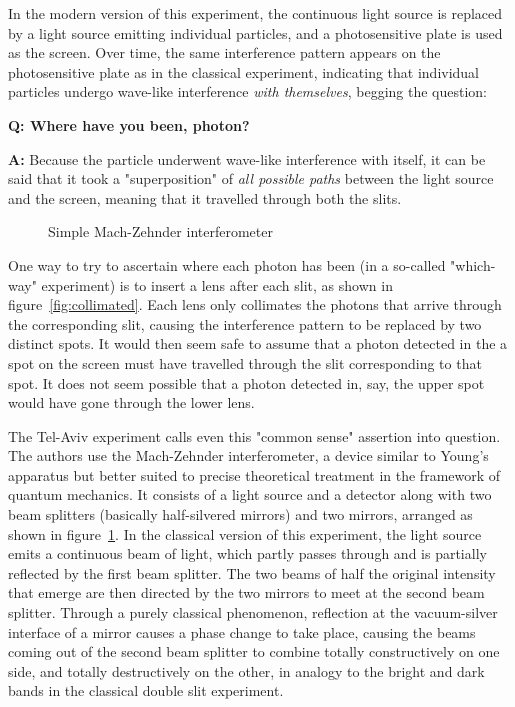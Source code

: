 \documentclass{article}
\newcommand{\Q}{\bfseries Q: }
\newcommand{\A}{\par\textbf{A:} \normalfont}
\begin{document}
In the modern version of this experiment, the continuous light source is 
replaced by a light source emitting individual particles, and a photosensitive 
plate is used as the screen. Over time, the same interference pattern appears 
on the photosensitive plate as in the classical experiment, indicating that 
individual particles undergo wave-like interference \textit{with themselves}, 
begging the question: 

\begin{framed}
\Q Where have you been, photon?  

\A Because the particle underwent wave-like interference with itself, it can be 
	said that it took a "superposition" of \textit{all possible paths} 
between the light source and the screen, meaning that it travelled through both 
the slits. \footnotemark \end{framed}


\begin{figure}[h]
	\centering
	
	\caption{Simple Mach-Zehnder interferometer}
	\label{fig:interferometer1}
\end{figure}

One way to try to ascertain where each photon has been (in a so-called 
"which-way" experiment) is to insert a lens after each slit, as shown in 
figure~\ref{fig:collimated}.  Each lens only collimates the photons that arrive 
through the corresponding slit, causing the interference pattern to be replaced 
by two distinct spots. It would then seem safe to assume that a photon detected 
in the a spot on the screen must have travelled through the slit corresponding 
to that spot. It does not seem possible that a photon detected in, say, the 
upper spot would have gone through the lower lens. 


The Tel-Aviv experiment calls even this "common sense" assertion into question.  
The authors use the Mach-Zehnder interferometer, a device similar to Young's 
apparatus but better suited to precise theoretical treatment in the framework 
of quantum mechanics. It consists of a light source and a detector along with 
two beam splitters (basically half-silvered mirrors) and two mirrors, arranged 
as shown in figure~\ref{fig:interferometer1}. In the classical version of this 
experiment, the light source emits a continuous beam of light, which partly 
passes through and is partially reflected by the first beam splitter. The two 
beams of half the original intensity that emerge are then directed by the two 
mirrors to meet at the second beam splitter. Through a purely classical 
phenomenon, reflection at the vacuum-silver interface of a mirror causes a 
phase change to take place, causing the beams coming out of the second beam 
splitter to combine totally constructively on one side, and totally 
destructively on the other, in analogy to the bright and dark bands in the 
classical double slit experiment. 
\end{document}
